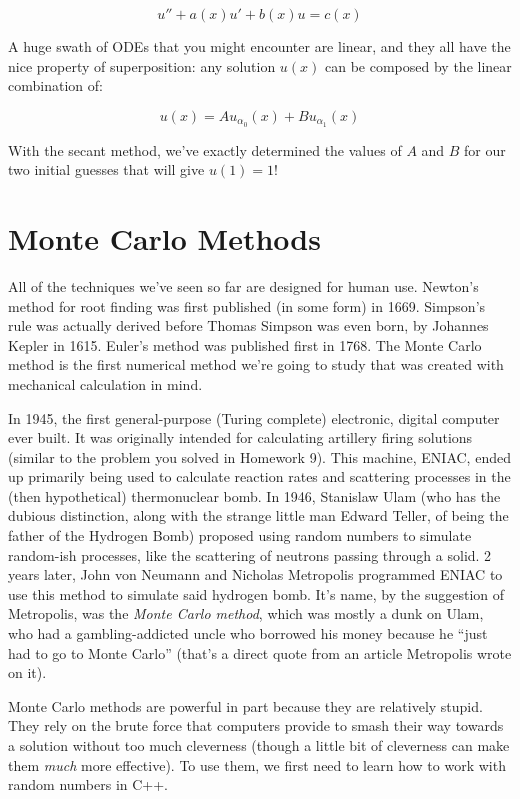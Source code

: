 \documentclass{article}
\theoremstyle{demo}
\begin{document}
\begin{equation}
    u'' + a(x)u' + b(x)u = c(x)
\end{equation}

A huge swath of ODEs that you might encounter are linear, and they all have the
nice property of superposition: any solution $u(x)$ can be composed by the
linear combination of:

\begin{equation}
    u(x) = Au_{\alpha_0}(x) + Bu_{\alpha_1}(x)
\end{equation}

With the secant method, we've exactly determined the values of $A$ and $B$ for
our two initial guesses that will give $u(1) = 1$!

\section{Monte Carlo Methods}
All of the techniques we've seen so far are designed for human use.  Newton's
method for root finding was first published (in some form) in 1669.  Simpson's
rule was actually derived before Thomas Simpson was even born, by Johannes
Kepler in 1615.  Euler's method was published first in 1768.  The Monte Carlo
method is the first numerical method we're going to study that was created with
mechanical calculation in mind.  

In 1945, the first general-purpose (Turing complete) electronic, digital
computer ever built.  It was originally intended for calculating artillery
firing solutions (similar to the problem you solved in Homework 9).  This
machine, ENIAC, ended up primarily being used to calculate reaction rates and
scattering processes in the (then hypothetical) thermonuclear bomb.  In 1946,
Stanislaw Ulam (who has the dubious distinction, along with the strange little
man Edward Teller, of being the father of the Hydrogen Bomb) proposed using
random numbers to simulate random-ish processes, like the scattering of neutrons
passing through a solid.  2 years later, John von Neumann and Nicholas
Metropolis programmed ENIAC to use this method to simulate said hydrogen bomb.
It's name, by the suggestion of Metropolis, was the \textit{Monte
Carlo method}, which was mostly a dunk on Ulam, who had a gambling-addicted
uncle who borrowed his money because he ``just had to go to Monte Carlo''
(that's a direct quote from an article Metropolis wrote on it).

Monte Carlo methods are powerful in part because they are relatively stupid.
They rely on the brute force that computers provide to smash their way towards a
solution without too much cleverness (though a little bit of cleverness can make
them \textit{much} more effective).  To use them, we first need to learn how to
work with random numbers in C++.
\end{document}
